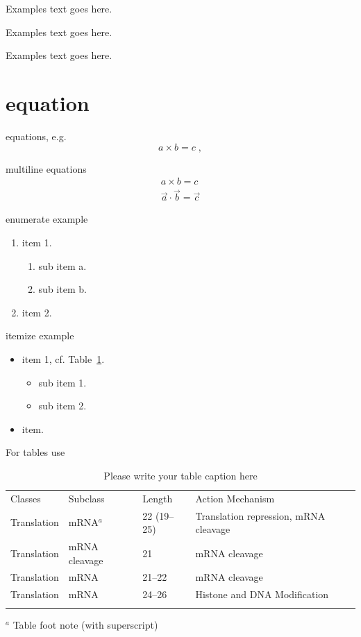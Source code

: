 \begin{question}
	Examples text goes here.
\end{question}

\begin{exercise}
	Examples text goes here.  
\end{exercise}

\begin{solution}
	Examples text goes here.  
\end{solution}


\section{equation}
equations, e.g.
\begin{equation}
a \times b = c\;,
\end{equation}

multiline equations
\begin{eqnarray}
a \times b = c \nonumber\\
\vec{a} \cdot \vec{b}=\vec{c}
\label{eq:01}
\end{eqnarray}

enumerate example
\begin{enumerate}
	\item{item 1.}
	\begin{enumerate}
		\item{sub item a.}
		\item{sub item b.}
	\end{enumerate}
	\item{item 2.}
\end{enumerate}

itemize example
\begin{itemize}
	\item{item 1, cf. Table~\ref{tab:1}.}
	\begin{itemize}
		\item{sub item 1.}
		\item{sub item 2.}
	\end{itemize}
	\item{item.}
\end{itemize}

For tables use
\begin{table}
	\caption{Please write your table caption here}
	\label{tab:1}       %
	\begin{tabular}{p{2cm}p{2.4cm}p{2cm}p{4.9cm}}
		\hline\noalign{\smallskip}
		Classes & Subclass & Length & Action Mechanism  \\
		\noalign{\smallskip}\svhline\noalign{\smallskip}
		Translation & mRNA$^a$  & 22 (19--25) & Translation repression, mRNA cleavage\\
		Translation & mRNA cleavage & 21 & mRNA cleavage\\
		Translation & mRNA  & 21--22 & mRNA cleavage\\
		Translation & mRNA  & 24--26 & Histone and DNA Modification\\
		\noalign{\smallskip}\hline\noalign{\smallskip}
	\end{tabular}
	$^a$ Table foot note (with superscript)
\end{table}


